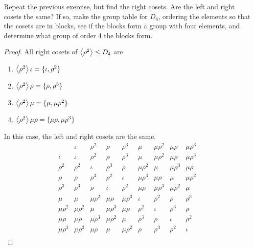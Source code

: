 \begin{exercise}
    Repeat the previous exercise, but find the right cosets. Are the left and right cosets the same? If so, make the group table for $D_{4}$, ordering the elements so that the cosets are in blocks, see if the blocks form a group with four elements, and determine what group of order 4 the blocks form.
\end{exercise}

\begin{proof}
    All right cosets of $\left\langle{\rho^{2}}\right\rangle \leq D_{4}$ are
    \begin{enumerate}[label={(\arabic*)}]
        \item $\left\langle{\rho^{2}}\right\rangle\iota = \{ \iota, \rho^{2} \}$
        \item $\left\langle{\rho^{2}}\right\rangle\rho = \{ \rho, \rho^{3} \}$
        \item $\left\langle{\rho^{2}}\right\rangle\mu = \{ \mu, \mu\rho^{2} \}$
        \item $\left\langle{\rho^{2}}\right\rangle\mu\rho = \{ \mu\rho, \mu\rho^{3} \}$
    \end{enumerate}

    In this case, the left and right cosets are the same.
    \[
        \begin{array}{c||c|c||c|c||c|c||c|c}
                        & \iota       & \rho^{2}    & \rho        & \rho^{3}    & \mu         & \mu\rho^{2} & \mu\rho     & \mu\rho^{3} \\
            \hline\hline
            \iota       & \iota       & \rho^{2}    & \rho        & \rho^{3}    & \mu         & \mu\rho^{2} & \mu\rho     & \mu\rho^{3} \\
            \hline
            \rho^{2}    & \rho^{2}    & \iota       & \rho^{3}    & \rho        & \mu\rho^{2} & \mu         & \mu\rho^{3} & \mu\rho     \\
            \hline\hline
            \rho        & \rho        & \rho^{3}    & \rho^{2}    & \iota       & \mu\rho^{3} & \mu\rho     & \mu         & \mu\rho^{2} \\
            \hline
            \rho^{3}    & \rho^{3}    & \rho        & \iota       & \rho^{2}    & \mu\rho     & \mu\rho^{3} & \mu\rho^{2} & \mu         \\
            \hline\hline
            \mu         & \mu         & \mu\rho^{2} & \mu\rho     & \mu\rho^{3} & \iota       & \rho^{2}    & \rho        & \rho^{3}    \\
            \hline
            \mu\rho^{2} & \mu\rho^{2} & \mu         & \mu\rho^{3} & \mu\rho     & \rho^{2}    & \iota       & \rho^{3}    & \rho        \\
            \hline\hline
            \mu\rho     & \mu\rho     & \mu\rho^{3} & \mu\rho^{2} & \mu         & \rho^{3}    & \rho        & \iota       & \rho^{2}    \\
            \hline
            \mu\rho^{3} & \mu\rho^{3} & \mu\rho     & \mu         & \mu\rho^{2} & \rho        & \rho^{3}    & \rho^{2}    & \iota       \\
        \end{array}
    \]


\end{proof}
